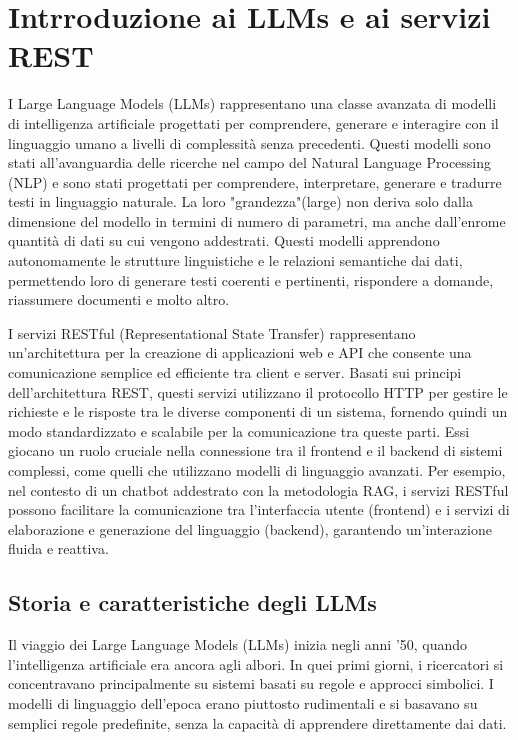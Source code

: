 \documentclass[a4paper,twoside,12pt]{toptesi}
\begin{document}
\chapter{Intrroduzione ai LLMs e ai servizi REST}

I Large Language Models (LLMs) rappresentano una classe avanzata di modelli di intelligenza artificiale progettati per comprendere, generare e interagire con il linguaggio umano a livelli di complessità senza precedenti. Questi modelli sono stati all’avanguardia delle ricerche nel campo del Natural Language Processing (NLP) e sono stati progettati per comprendere, interpretare, generare e tradurre testi in linguaggio naturale. La loro "grandezza"(large) non deriva solo dalla dimensione del modello in termini di numero di parametri, ma anche dall’enrome quantità di dati su cui vengono addestrati. Questi modelli apprendono autonomamente le strutture linguistiche e le relazioni semantiche dai dati, permettendo loro di generare testi coerenti e pertinenti, rispondere a domande, riassumere documenti e molto altro.

I servizi RESTful (Representational State Transfer) rappresentano un'architettura per la creazione di applicazioni web e API che consente una comunicazione semplice ed efficiente tra client e server. Basati sui principi dell'architettura REST, questi servizi utilizzano il protocollo HTTP per gestire le richieste e le risposte tra le diverse componenti di un sistema, fornendo quindi un modo standardizzato e scalabile per la comunicazione tra queste parti. Essi giocano un ruolo cruciale nella connessione tra il frontend e il backend di sistemi complessi, come quelli che utilizzano modelli di linguaggio avanzati. Per esempio, nel contesto di un chatbot addestrato con la metodologia RAG, i servizi RESTful possono facilitare la comunicazione tra l'interfaccia utente (frontend) e i servizi di elaborazione e generazione del linguaggio (backend), garantendo un'interazione fluida e reattiva.

\section{Storia e caratteristiche degli LLMs}
Il viaggio dei Large Language Models (LLMs) inizia negli anni ’50, quando l'intelligenza artificiale era ancora agli albori. In quei primi giorni, i ricercatori si concentravano principalmente su sistemi basati su regole e approcci simbolici. I modelli di linguaggio dell'epoca erano piuttosto rudimentali e si basavano su semplici regole predefinite, senza la capacità di apprendere direttamente dai dati.
\end{document}
